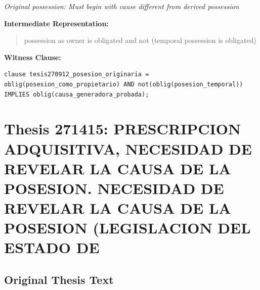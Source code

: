 \documentclass[11pt,a4paper]{article}
\begin{document}
\textit{Original possession: Must begin with cause different from derived possession}

\textbf{Intermediate Representation:}

\begin{quote}
possession as owner is obligated and not (temporal possession is obligated)
\end{quote}

\textbf{Witness Clause:}

\begin{lstlisting}[style=witnessstyle, language=Witness]
clause tesis270912_posesion_originaria = oblig(posesion_como_propietario) AND not(oblig(posesion_temporal)) IMPLIES oblig(causa_generadora_probada);
\end{lstlisting}

\newpage

\section{Thesis 271415: PRESCRIPCION ADQUISITIVA, NECESIDAD DE REVELAR LA CAUSA DE LA POSESION. NECESIDAD DE REVELAR LA CAUSA DE LA POSESION (LEGISLACION DEL ESTADO DE}
\label{thesis:271415}

\subsection{Original Thesis Text}
\end{document}
